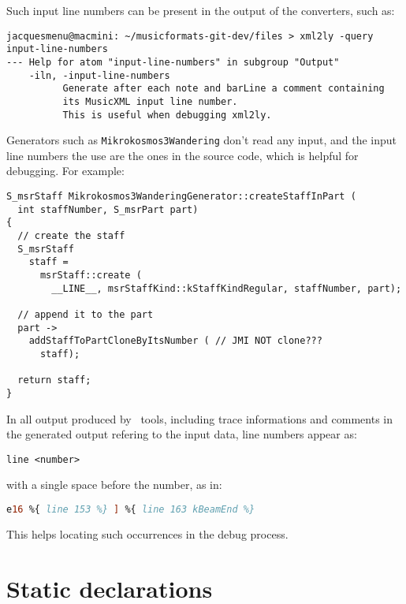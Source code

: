 Such input line numbers can be present in the output of the converters, such as:
\begin{lstlisting}[language=Terminal]
jacquesmenu@macmini: ~/musicformats-git-dev/files > xml2ly -query input-line-numbers
--- Help for atom "input-line-numbers" in subgroup "Output"
    -iln, -input-line-numbers
          Generate after each note and barLine a comment containing
          its MusicXML input line number.
          This is useful when debugging xml2ly.
\end{lstlisting}

Generators such as {\tt Mikrokosmos3Wandering} don't read any input, and the input line numbers the use are the ones in the source code, which is helpful for debugging. For example:
\begin{lstlisting}[language=CPlusPlus]
S_msrStaff Mikrokosmos3WanderingGenerator::createStaffInPart (
  int staffNumber, S_msrPart part)
{
  // create the staff
  S_msrStaff
    staff =
      msrStaff::create (
        __LINE__, msrStaffKind::kStaffKindRegular, staffNumber, part);

  // append it to the part
  part ->
    addStaffToPartCloneByItsNumber ( // JMI NOT clone???
      staff);

  return staff;
}
\end{lstlisting}

In all output produced by \mf\ tools, including trace informations and comments in the generated output refering to the input data, line numbers appear as:
\begin{lstlisting}[language=Terminal]
	line <number>
\end{lstlisting}
with a single space before the number, as in:
\begin{lstlisting}[language=Lilypond]
	e16 %{ line 153 %} ] %{ line 163 kBeamEnd %}
\end{lstlisting}

This helps locating such occurrences in the debug process.


\section{Static declarations}

